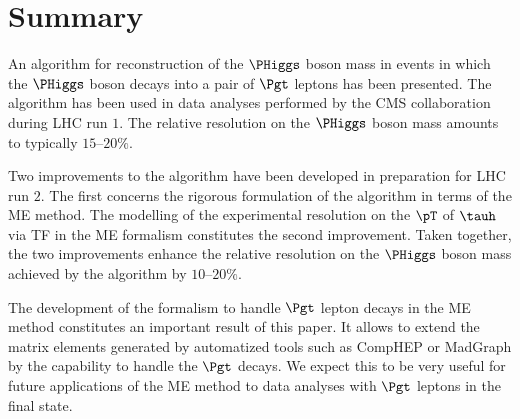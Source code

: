 \section{Summary}
\label{sec:summary}

An algorithm for reconstruction of the $\PHiggs$ boson mass in events
in which the $\PHiggs$ boson decays into a pair of $\Pgt$ leptons has been
presented.
The algorithm has been used in data analyses performed by the CMS
collaboration during LHC run $1$.
The relative resolution on the $\PHiggs$ boson mass amounts to typically
$15$--$20\%$.

Two improvements to the algorithm have been developed in preparation
for LHC run $2$.
The first concerns the rigorous formulation of the
algorithm in terms of the ME method.
The modelling of the experimental resolution on the $\pT$ of $\tauh$ via TF in the ME
formalism constitutes the second improvement.
Taken together, the two improvements enhance the relative resolution on the $\PHiggs$ boson mass
achieved by the algorithm by $10$--$20\%$.

The development of the formalism to handle $\Pgt$ lepton decays
in the ME method constitutes an important result of this paper.
It allows to extend the matrix elements generated by automatized tools such as
CompHEP or MadGraph by the capability to handle the
$\Pgt$ decays. We expect this to be very useful for future
applications of the ME method to data analyses with $\Pgt$ leptons in
the final state. 
